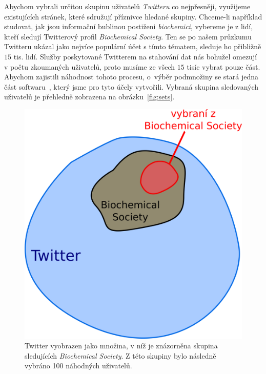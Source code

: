 \documentclass[12pt, a4paper]{article}
\numberwithin{equation}{section} 	%
\begin{document}
Abychom vybrali určitou skupinu uživatelů \textit{Twitteru} co nejpřesněji, využijeme existujících stránek, které sdružují příznivce hledané skupiny. Chceme-li například studovat, jak jsou informační bublinou postiženi \textit{biochemici}, vybereme je z lidí, kteří sledují Twitterový profil \textit{Biochemical Society}. Ten se po našem průzkumu Twitteru ukázal jako nejvíce populární účet s tímto tématem, sleduje ho přibližně $15$ tis. lidí. Služby poskytované Twitterem na stahování dat nás bohužel omezují v počtu zkoumaných uživatelů, proto musíme ze všech $15$ tisíc vybrat pouze část. Abychom zajistili náhodnost tohoto procesu, o~výběr podmnožiny se stará jedna část softwaru~\cite{myRepo}, který jsme pro tyto účely vytvořili. Vybraná skupina sledovaných uživatelů je přehledně zobrazena na obrázku~\autoref{fig:sets}.
\begin{figure}[h]\centering
\includegraphics[scale=0.27]{./Pics/sets.png}
    \caption{Twitter vyobrazen jako množina, v níž je znázorněna skupina sledujících \textit{Biochemical Society}. Z této skupiny bylo následně vybráno 100 náhodných uživatelů.}
\label{fig:sets}
\end{figure}
\end{document}
